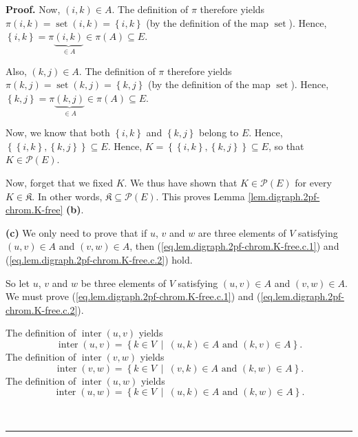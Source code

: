 \documentclass[numbers=enddot,12pt,final,onecolumn,notitlepage]{scrartcl}%
\theoremstyle{definition}
\newenvironment{proof}[1][Proof]{\noindent\textbf{#1.} }{\ \rule{0.5em}{0.5em}}
\newenvironment{verlong}{}{}
\begin{document}
\begin{verlong}
\begin{proof}
Now, $\left(  i,k\right)  \in A$. The definition of $\pi$ therefore yields
$\pi\left(  i,k\right)  =\operatorname*{set}\left(  i,k\right)  =\left\{
i,k\right\}  $ (by the definition of the map $\operatorname*{set}$). Hence,
$\left\{  i,k\right\}  =\pi\underbrace{\left(  i,k\right)  }_{\in A}\in
\pi\left(  A\right)  \subseteq E$.

Also, $\left(  k,j\right)  \in A$. The definition of $\pi$ therefore yields
$\pi\left(  k,j\right)  =\operatorname*{set}\left(  k,j\right)  =\left\{
k,j\right\}  $ (by the definition of the map $\operatorname*{set}$). Hence,
$\left\{  k,j\right\}  =\pi\underbrace{\left(  k,j\right)  }_{\in A}\in
\pi\left(  A\right)  \subseteq E$.

Now, we know that both $\left\{  i,k\right\}  $ and $\left\{  k,j\right\}  $
belong to $E$. Hence, $\left\{  \left\{  i,k\right\}  ,\left\{  k,j\right\}
\right\}  \subseteq E$. Hence, $K=\left\{  \left\{  i,k\right\}  ,\left\{
k,j\right\}  \right\}  \subseteq E$, so that $K\in\mathcal{P}\left(  E\right)
$.

Now, forget that we fixed $K$. We thus have shown that $K\in\mathcal{P}\left(
E\right)  $ for every $K\in\mathfrak{K}$. In other words, $\mathfrak{K}%
\subseteq\mathcal{P}\left(  E\right)  $. This proves Lemma
\ref{lem.digraph.2pf-chrom.K-free} \textbf{(b)}.

\textbf{(c)} We only need to prove that if $u$, $v$ and $w$ are three elements
of $V$ satisfying $\left(  u,v\right)  \in A$ and $\left(  v,w\right)  \in A$,
then (\ref{eq.lem.digraph.2pf-chrom.K-free.c.1}) and
(\ref{eq.lem.digraph.2pf-chrom.K-free.c.2}) hold.

So let $u$, $v$ and $w$ be three elements of $V$ satisfying $\left(
u,v\right)  \in A$ and $\left(  v,w\right)  \in A$. We must prove
(\ref{eq.lem.digraph.2pf-chrom.K-free.c.1}) and
(\ref{eq.lem.digraph.2pf-chrom.K-free.c.2}).

The definition of $\operatorname*{inter}\left(  u,v\right)  $ yields%
\[
\operatorname*{inter}\left(  u,v\right)  =\left\{  k\in V\ \mid\ \left(
u,k\right)  \in A\text{ and }\left(  k,v\right)  \in A\right\}  .
\]
The definition of $\operatorname*{inter}\left(  v,w\right)  $ yields%
\[
\operatorname*{inter}\left(  v,w\right)  =\left\{  k\in V\ \mid\ \left(
v,k\right)  \in A\text{ and }\left(  k,w\right)  \in A\right\}  .
\]
The definition of $\operatorname*{inter}\left(  u,w\right)  $ yields%
\[
\operatorname*{inter}\left(  u,w\right)  =\left\{  k\in V\ \mid\ \left(
u,k\right)  \in A\text{ and }\left(  k,w\right)  \in A\right\}  .
\]



\end{proof}
\end{verlong}
\end{document}
